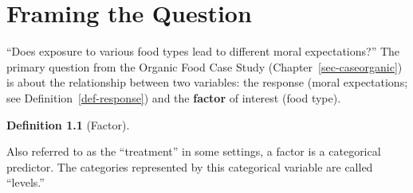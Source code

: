 \documentclass[
  letterpaper,
  DIV=11,
  numbers=noendperiod]{scrreprt}
\theoremstyle{definition}
\newtheorem{definition}{Definition}[chapter]
\theoremstyle{definition}
\theoremstyle{plain}
\theoremstyle{remark}
\begin{document}
\begin{table}

\caption{\label{tbl-caseorganic-table}Subset of data from study
characterizing moral behavior following exposure to various food
categories.}


\end{table}%

\chapter{Framing the Question}\label{sec-anovaquestions}

``Does exposure to various food types lead to different moral
expectations?'' The primary question from the Organic Food Case Study
(Chapter~\ref{sec-caseorganic}) is about the relationship between two
variables: the response (moral expectations; see
Definition~\ref{def-response}) and the \textbf{factor} of interest (food
type).

\begin{definition}[Factor]\protect\hypertarget{def-factor}{}\label{def-factor}

Also referred to as the ``treatment'' in some settings, a factor is a
categorical predictor. The categories represented by this categorical
variable are called ``levels.''

\end{definition}
\end{document}
